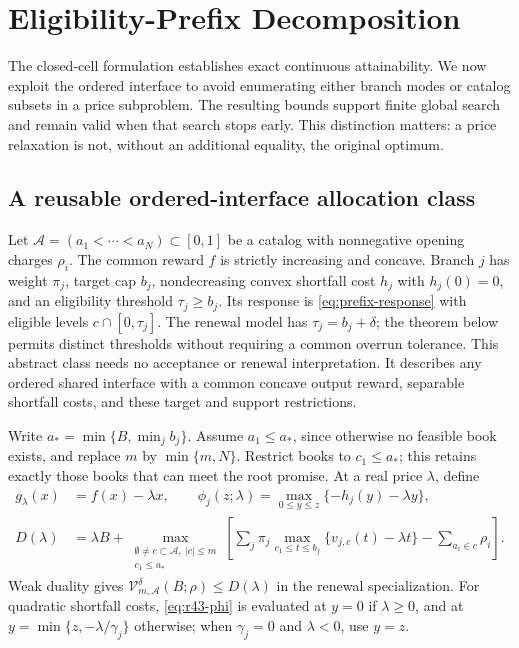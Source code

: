 \section{Eligibility-Prefix Decomposition}\label{sec:r43-decomposition}
The closed-cell formulation establishes exact continuous attainability. We now exploit the ordered interface to avoid enumerating either branch modes or catalog subsets in a price subproblem. The resulting bounds support finite global search and remain valid when that search stops early. This distinction matters: a price relaxation is not, without an additional equality, the original optimum.

\subsection{A reusable ordered-interface allocation class}
Let $\mathcal A=(a_1<\cdots<a_N)\subset[0,1]$ be a catalog with nonnegative opening charges $\rho_i$. The common reward $f$ is strictly increasing and concave. Branch $j$ has weight $\pi_j$, target cap $b_j$, nondecreasing convex shortfall cost $h_j$ with $h_j(0)=0$, and an eligibility threshold $\tau_j\geq b_j$. Its response is \eqref{eq:prefix-response} with eligible levels $c\cap[0,\tau_j]$. The renewal model has $\tau_j=b_j+\delta$; the theorem below permits distinct thresholds without requiring a common overrun tolerance. This abstract class needs no acceptance or renewal interpretation. It describes any ordered shared interface with a common concave output reward, separable shortfall costs, and these target and support restrictions.

Write $a_* = \min\{B,\min_jb_j\}$. Assume $a_1\leq a_*$, since otherwise no feasible book exists, and replace $m$ by $\min\{m,N\}$. Restrict books to $c_1\leq a_*$; this retains exactly those books that can meet the root promise. At a real price $\lambda$, define
\begin{align}
 g_\lambda(x)&=f(x)-\lambda x,\qquad
 \phi_j(z;\lambda)=\max_{0\leq y\leq z}\{-h_j(y)-\lambda y\},\label{eq:r43-phi}\\
 D(\lambda)&=\lambda B+
 \max_{\substack{\emptyset\ne c\subset\mathcal A,\ |c|\leq m\\c_1\leq a_*}}
 \left[\sum_j\pi_j\max_{c_1\leq t\leq b_j}
       \{v_{j,c}(t)-\lambda t\}-\sum_{a_i\in c}\rho_i\right].\label{eq:r43-dual}
\end{align}
Weak duality gives $\mathcal V_{m,\mathcal A}^\delta(B;\rho)\leq D(\lambda)$ in the renewal specialization. For quadratic shortfall costs, \eqref{eq:r43-phi} is evaluated at $y=0$ if $\lambda\geq0$, and at $y=\min\{z,-\lambda/\gamma_j\}$ otherwise; when $\gamma_j=0$ and $\lambda<0$, use $y=z$.

